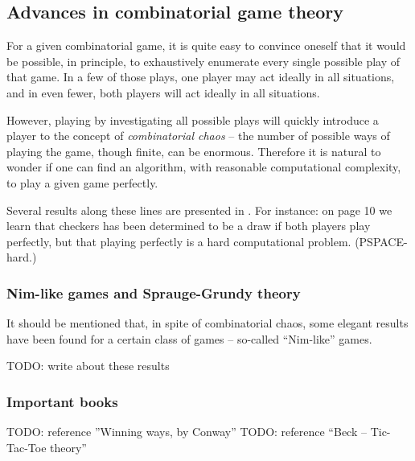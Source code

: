 \subsection{Advances in combinatorial game theory}

For a given combinatorial game, it is quite easy to convince oneself that it would be possible, in principle, to exhaustively enumerate every single possible play of that game.
In a few of those plays, one player may act ideally in all situations, and in even fewer, both players will act ideally in all situations.

However, playing by investigating all possible plays will quickly introduce a player to the concept of \emph{combinatorial chaos} -- the number of possible ways of playing the game, though finite, can be enormous.
Therefore it is natural to wonder if one can find an algorithm, with reasonable computational complexity, to play a given game perfectly.

Several results along these lines are presented in \citep{demaine_hearn08}. For instance: on page 10 we learn that checkers has been determined to be a draw if both players play perfectly, but that playing perfectly is a hard computational problem. (PSPACE-hard.)

\subsubsection{Nim-like games and Sprauge-Grundy theory}

It should be mentioned that, in spite of combinatorial chaos, some elegant results have been found for a certain class of games -- so-called ``Nim-like'' games.

TODO: write about these results

\subsubsection{Important books}

TODO: reference ''Winning ways, by Conway''
TODO: reference ``Beck -- Tic-Tac-Toe theory''
